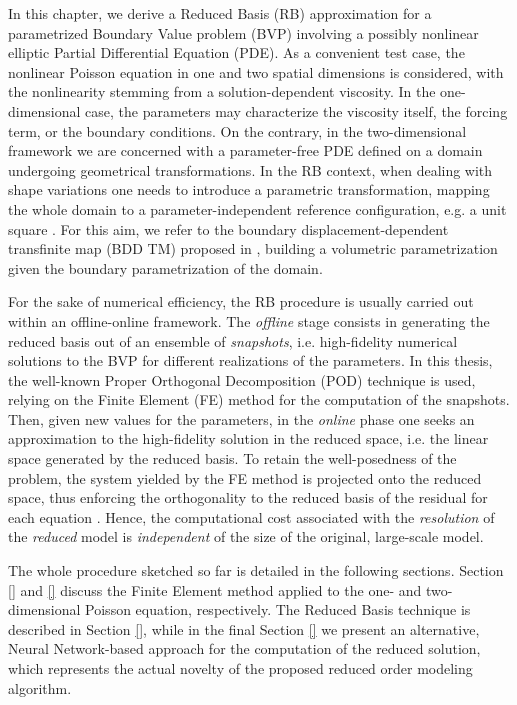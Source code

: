 \documentclass[11pt, a4paper]{report}
\numberwithin{equation}{chapter}
\theoremstyle{theorem}
\theoremstyle{definition}
\numberwithin{figure}{section}
\begin{document}
		In this chapter, we derive a Reduced Basis (RB) approximation for a parametrized Boundary Value problem (BVP) involving a possibly nonlinear elliptic Partial Differential Equation (PDE). As a convenient test case, the nonlinear Poisson equation in one and two spatial dimensions is considered, with the nonlinearity stemming from a solution-dependent viscosity. In the one-dimensional case, the parameters may characterize the viscosity itself, the forcing term, or the boundary conditions. On the contrary, in the two-dimensional framework we are concerned with a parameter-free PDE defined on a domain undergoing geometrical transformations. In the RB context, when dealing with shape variations one needs to introduce a parametric transformation, mapping the whole domain to a parameter-independent reference configuration, e.g. a unit square \cite{MN16}. For this aim, we refer to the boundary displacement-dependent transfinite map (BDD TM) proposed in \cite{JIR14}, building a volumetric parametrization given the boundary parametrization of the domain. 
		
		For the sake of numerical efficiency, the RB procedure is usually carried out within an offline-online framework. The \emph{offline} stage consists in generating the reduced basis out of an ensemble of \emph{snapshots}, i.e. high-fidelity numerical solutions to the BVP for different realizations of the parameters. In this thesis, the well-known Proper Orthogonal Decomposition (POD) technique is used, relying on the Finite Element (FE) method for the computation of the snapshots. Then, given new values for the parameters, in the \emph{online} phase one seeks an approximation to the high-fidelity solution in the reduced space, i.e. the linear space generated by the reduced basis. To retain the well-posedness of the problem, the system yielded by the FE method is projected onto the reduced space, thus enforcing the orthogonality to the reduced basis of the residual for each equation \cite{HRS15,MN16}. Hence, the computational cost associated with the \emph{resolution} of the \emph{reduced} model is \emph{independent} of the size of the original, large-scale model. 
		
		The whole procedure sketched so far is detailed in the following sections. Section \ref{} and \ref{} discuss the Finite Element method applied to the one- and two-dimensional Poisson equation, respectively. The Reduced Basis technique is described in Section \ref{}, while in the final Section \ref{} we present an alternative, Neural Network-based approach for the computation of the reduced solution, which represents the actual novelty of the proposed reduced order modeling algorithm.
		
\end{document}
